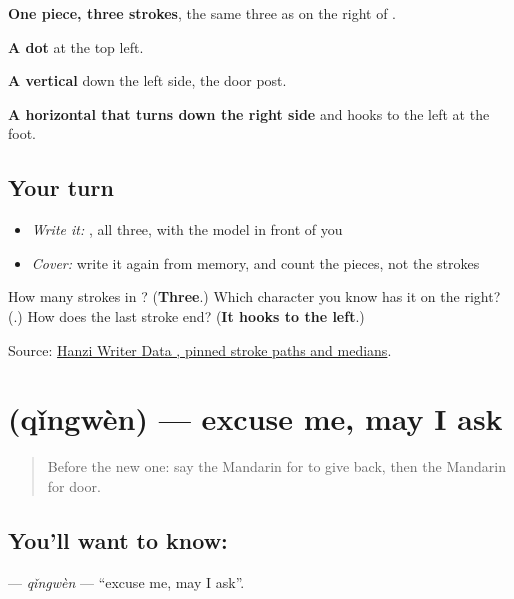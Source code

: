 \begin{quote}
\end{quote}

\textbf{One piece, three strokes}, the same three as on the right of .

\textbf{A dot} at the top left.

\textbf{A vertical} down the left side, the door post.

\textbf{A horizontal that turns down the right side} and hooks to the left at the foot.

\subsection*{Your turn}
\begin{itemize}
\raggedright
  \item \emph{Write it:} , all three, with the model in front of you
  \item \emph{Cover:} write it again from memory, and count the pieces, not the strokes
\end{itemize}

\begin{tcolorbox}[breakable,colback=teal!4,colframe=teal!35!black,title={Before you move on}]
How many strokes in ? (\textbf{Three}.) Which character you know has it on the right? (\textbf{}.) How does the last stroke end? (\textbf{It hooks to the left}.)

Source: \href{https://raw.githubusercontent.com/chanind/hanzi-writer-data/68d10a4b21150cae5e1ebbd223eed289cf32d90c/data/\%E9\%97\%A8.json}{Hanzi Writer Data , pinned stroke paths and medians}.
\end{tcolorbox}
\section[\texorpdfstring{\zh{请问} (qǐngwèn)}{请问 (qǐngwèn)}]{ (qǐngwèn) — excuse me, may I ask}

\label{lesson:ZH-C65-qingwen}



\begin{quote}
Before the new one: say the Mandarin for to give back, then the Mandarin for door.
\end{quote}

\subsection*{You'll want to know: }
\textbf{} — \emph{qǐngwèn} — \textquotedblleft{}excuse me, may I ask\textquotedblright{}.


